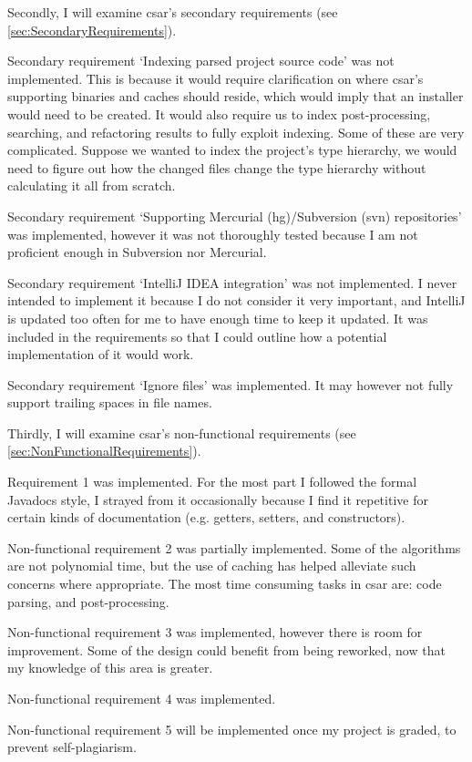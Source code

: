 \documentclass[12pt, letterpaper]{article}
\begin{document}
Secondly, I will examine csar's secondary requirements (see \ref{sec:SecondaryRequirements}).

Secondary requirement `Indexing parsed project source code' was not implemented.
This is because it would require clarification on where csar's supporting binaries and caches should reside, which would imply that an installer would need to be created.
It would also require us to index post-processing, searching, and refactoring results to fully exploit indexing.
Some of these are very complicated.
Suppose we wanted to index the project's type hierarchy, we would need to figure out how the changed files change the type hierarchy without calculating it all from scratch.

Secondary requirement `Supporting Mercurial (hg)/Subversion (svn) repositories' was implemented, however it was not thoroughly tested because I am not proficient enough in Subversion nor Mercurial.

Secondary requirement `IntelliJ IDEA integration' was not implemented.
I never intended to implement it because I do not consider it very important, and IntelliJ is updated too often for me to have enough time to keep it updated.
It was included in the requirements so that I could outline how a potential implementation of it would work.

Secondary requirement `Ignore files' was implemented.
It may however not fully support trailing spaces in file names.

Thirdly, I will examine csar's non-functional requirements (see \ref{sec:NonFunctionalRequirements}).

Requirement 1 was implemented.
For the most part I followed the formal Javadocs style, I strayed from it occasionally because I find it repetitive for certain kinds of documentation (e.g. getters, setters, and constructors).

Non-functional requirement 2 was partially implemented.
Some of the algorithms are not polynomial time, but the use of caching has helped alleviate such concerns where appropriate.
The most time consuming tasks in csar are: code parsing, and post-processing.

Non-functional requirement 3 was implemented, however there is room for improvement.
Some of the design could benefit from being reworked, now that my knowledge of this area is greater.

Non-functional requirement 4 was implemented.

Non-functional requirement 5 will be implemented once my project is graded, to prevent self-plagiarism.
\end{document}
